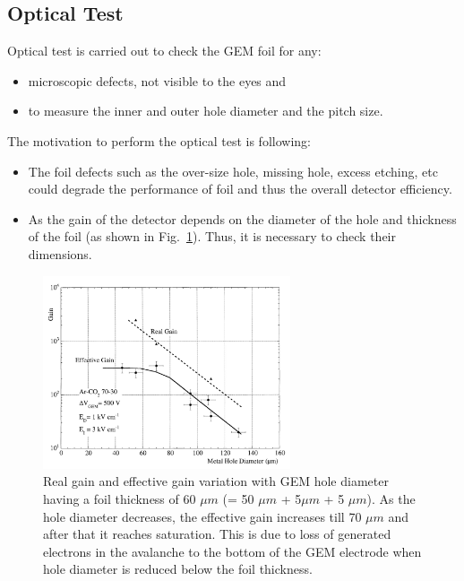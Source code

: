 \subsection{Optical Test} %
\label{sub:optical_test}
Optical test is carried out to check the GEM foil for any:
\begin{itemize}
    \item microscopic defects, not visible to the eyes and
    \item to measure the inner and outer hole diameter and the pitch size.
\end{itemize}
The motivation to perform the optical test is following:
\begin{itemize}
    \item The foil defects such as the over-size hole, missing hole, excess etching, etc could degrade the performance of foil and thus the overall detector efficiency.
    \item As the gain of the detector depends on the diameter of the hole and thickness of the foil (as shown in Fig.~\ref{fig:gain-vs-holediameter}).
    Thus, it is necessary to check their dimensions.
\end{itemize}
\begin{figure}[htbp]
    \centering
    \includegraphics[width=0.65\textwidth]{figures/GEM/Gain_Vs_Hole_Diameter.png}
    \caption{Real gain and effective gain variation with GEM hole diameter~\cite{Bachmann1999} having a foil thickness of 60 $\mu m$ (= 50 $\mu m$ + 5$ \mu m$ + 5 $\mu m$). As the hole diameter decreases, the effective gain increases till 70 $\mu m$ and after that it reaches saturation. This is due to loss of generated electrons in the avalanche to the bottom of the GEM electrode when hole diameter is reduced below the foil thickness.}
    \label{fig:gain-vs-holediameter}
\end{figure}
